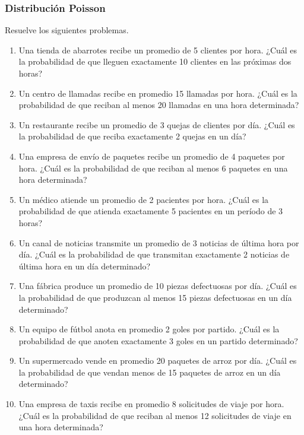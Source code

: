 \subsubsection{Distribución Poisson}

\begin{Ejer} Resuelve los siguientes problemas.

\begin{enumerate}
    \item Una tienda de abarrotes recibe un promedio de 5 clientes por hora. ¿Cuál es la probabilidad de que lleguen exactamente 10 clientes en las próximas dos horas?
    \item Un centro de llamadas recibe en promedio 15 llamadas por hora. ¿Cuál es la probabilidad de que reciban al menos 20 llamadas en una hora determinada?
    \item Un restaurante recibe un promedio de 3 quejas de clientes por día. ¿Cuál es la probabilidad de que reciba exactamente 2 quejas en un día?
    \item Una empresa de envío de paquetes recibe un promedio de 4 paquetes por hora. ¿Cuál es la probabilidad de que reciban al menos 6 paquetes en una hora determinada?
    \item Un médico atiende un promedio de 2 pacientes por hora. ¿Cuál es la probabilidad de que atienda exactamente 5 pacientes en un período de 3 horas?
    \item Un canal de noticias transmite un promedio de 3 noticias de última hora por día. ¿Cuál es la probabilidad de que transmitan exactamente 2 noticias de última hora en un día determinado?
    \item Una fábrica produce un promedio de 10 piezas defectuosas por día. ¿Cuál es la probabilidad de que produzcan al menos 15 piezas defectuosas en un día determinado?
    \item Un equipo de fútbol anota en promedio 2 goles por partido. ¿Cuál es la probabilidad de que anoten exactamente 3 goles en un partido determinado?
    \item Un supermercado vende en promedio 20 paquetes de arroz por día. ¿Cuál es la probabilidad de que vendan menos de 15 paquetes de arroz en un día determinado?
    \item Una empresa de taxis recibe en promedio 8 solicitudes de viaje por hora. ¿Cuál es la probabilidad de que reciban al menos 12 solicitudes de viaje en una hora determinada?
\end{enumerate}
\end{Ejer}
